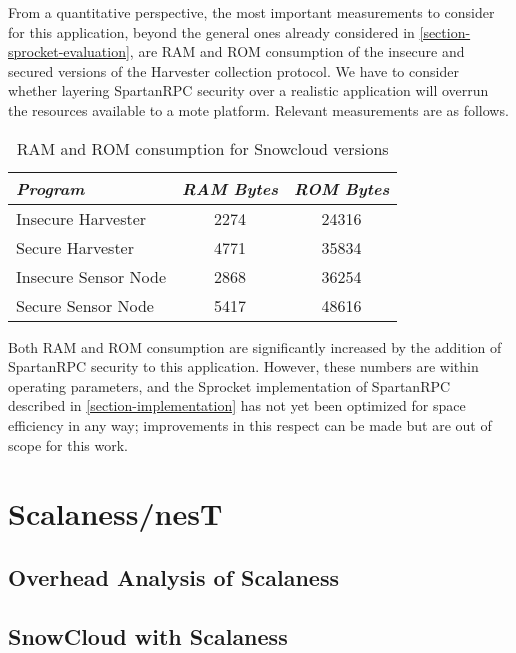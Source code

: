 From a quantitative perspective, the most important measurements to consider for this
application, beyond the general ones already considered in
\autoref{section-sprocket-evaluation}, are RAM and ROM consumption of the insecure and secured
versions of the Harvester collection protocol. We have to consider whether layering SpartanRPC
security over a realistic application will overrun the resources available to a mote platform.
Relevant measurements are as follows.
\begin{table}[h]
\centering \newcommand\T{\rule{0pt}{2.1ex}} \caption{RAM and ROM
  consumption for Snowcloud versions} {
\begin{tabular}{|l|c|c|}
\hline
\emph{Program} \T       & \emph{RAM Bytes} & \emph{ROM Bytes} \\ \hline\hline
Insecure Harvester \T   &             2274 &            24316 \\ \hline
Secure Harvester \T     &             4771 &            35834 \\ \hline
Insecure Sensor Node \T &             2868 &            36254 \\ \hline
Secure Sensor Node \T   &             5417 &            48616 \\ \hline
\end{tabular}
}
\label{table-snowcloud}
\end{table}

Both RAM and ROM consumption are significantly increased by the addition of SpartanRPC security
to this application. However, these numbers are within operating parameters, and the Sprocket
implementation of SpartanRPC described in \autoref{section-implementation} has not yet been
optimized for space efficiency in any way; improvements in this respect can be made but are out
of scope for this work.

\section{Scalaness/nesT}

\subsection{Overhead Analysis of Scalaness}


\subsection{SnowCloud with Scalaness}

